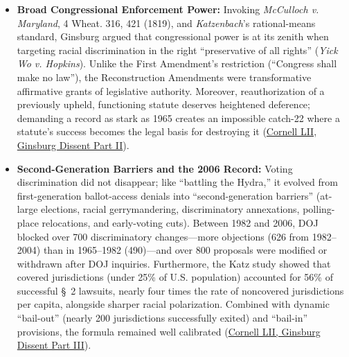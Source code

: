 \documentclass[12pt]{article}
\begin{document}
\begin{itemize}
    \item \textbf{Broad Congressional Enforcement Power:} Invoking \emph{McCulloch v. Maryland}, 4 Wheat. 316, 421 (1819), and \emph{Katzenbach}'s rational-means standard, Ginsburg argued that congressional power is at its zenith when targeting racial discrimination in the right ``preservative of all rights'' (\emph{Yick Wo v. Hopkins}). Unlike the First Amendment's restriction (``Congress shall make no law''), the Reconstruction Amendments were transformative affirmative grants of legislative authority. Moreover, reauthorization of a previously upheld, functioning statute deserves heightened deference; demanding a record as stark as 1965 creates an impossible catch-22 where a statute's success becomes the legal basis for destroying it (\href{https://www.law.cornell.edu/supremecourt/text/12-96}{Cornell LII, Ginsburg Dissent Part II}).
    \item \textbf{Second-Generation Barriers and the 2006 Record:} Voting discrimination did not disappear; like ``battling the Hydra,'' it evolved from first-generation ballot-access denials into ``second-generation barriers'' (at-large elections, racial gerrymandering, discriminatory annexations, polling-place relocations, and early-voting cuts). Between 1982 and 2006, DOJ blocked over 700 discriminatory changes---more objections (626 from 1982--2004) than in 1965--1982 (490)---and over 800 proposals were modified or withdrawn after DOJ inquiries. Furthermore, the Katz study showed that covered jurisdictions (under 25\% of U.S. population) accounted for 56\% of successful \S~2 lawsuits, nearly four times the rate of noncovered jurisdictions per capita, alongside sharper racial polarization. Combined with dynamic ``bail-out'' (nearly 200 jurisdictions successfully exited) and ``bail-in'' provisions, the formula remained well calibrated (\href{https://www.law.cornell.edu/supremecourt/text/12-96}{Cornell LII, Ginsburg Dissent Part III}).

\end{itemize}
\end{document}

